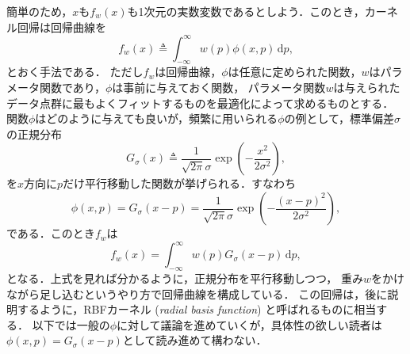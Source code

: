 簡単のため，$x$も$f_w(x)$も1次元の実数変数であるとしよう．このとき，カーネル回帰は回帰曲線を
\begin{equation}
\label{eqn:kernel_reg}
f_w(x) \triangleq \int_{-\infty}^{\infty} w(p) \phi(x, p) \, \mathrm{d}p,
\end{equation}
とおく手法である．
ただし$f_w$は回帰曲線，$\phi$は任意に定められた関数，$w$はパラメータ関数であり，$\phi$は事前に与えておく関数，
パラメータ関数$w$は与えられたデータ点群に最もよくフィットするものを最適化によって求めるものとする．
関数$\phi$はどのように与えても良いが，頻繁に用いられる$\phi$の例として，標準偏差$\sigma$の正規分布
\begin{equation}
G_\sigma(x) \triangleq \frac{1}{\sqrt{2\pi}\sigma}
\exp \left( -\frac{x^2}{2\sigma^2} \right),
\end{equation}
を$x$方向に$p$だけ平行移動した関数が挙げられる．すなわち
\begin{equation}
\phi(x, p)
= G_\sigma (x - p)
= \frac{1}{\sqrt{2\pi}\sigma} \exp \left( -\frac{(x - p)^2}{2\sigma^2} \right),
\end{equation}
である．このとき$f_w$は
\begin{equation}
f_w(x) = \int_{-\infty}^{\infty} w(p) G_\sigma (x - p) \, \mathrm{d}p,
\end{equation}
となる．上式を見れば分かるように，正規分布を平行移動しつつ，
重み$w$をかけながら足し込むというやり方で回帰曲線を構成している．
この回帰は，後に説明するように，RBFカーネル (\textit{radial basis function}) と呼ばれるものに相当する．
以下では一般の$\phi$に対して議論を進めていくが，具体性の欲しい読者は$\phi(x, p) = G_\sigma(x - p)$として読み進めて構わない．

